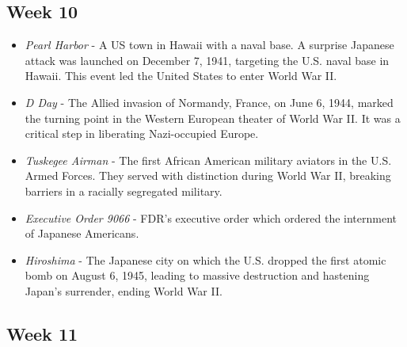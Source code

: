 \documentclass[12pt]{article}
\begin{document}
\subsection*{Week 10}

\begin{itemize}
    \item\textit{Pearl Harbor} - A US town in Hawaii with a naval base. A surprise Japanese attack was launched on December 7, 1941, targeting the U.S. naval base in Hawaii. This event led the United States to enter World War II.

    \item\textit{D Day} - The Allied invasion of Normandy, France, on June 6, 1944, marked the turning point in the Western European theater of World War II. It was a critical step in liberating Nazi-occupied Europe.
    
    \item\textit{Tuskegee Airman} - The first African American military aviators in the U.S. Armed Forces. They served with distinction during World War II, breaking barriers in a racially segregated military.
    
    \item\textit{Executive Order 9066} - FDR's executive order which ordered the internment of Japanese Americans.
    
    \item\textit{Hiroshima} - The Japanese city on which the U.S. dropped the first atomic bomb on August 6, 1945, leading to massive destruction and hastening Japan’s surrender, ending World War II.
\end{itemize}

\subsection*{Week 11}
\end{document}
